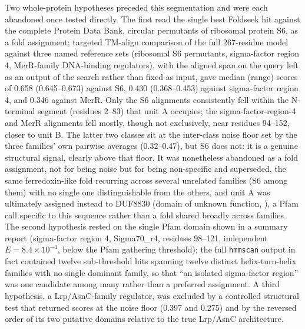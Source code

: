 \documentclass[11pt,a4paper]{article}
\begin{document}
Two whole-protein hypotheses preceded this segmentation and were each abandoned once tested
directly. The first read the single best Foldseek hit against the complete Protein Data Bank,
circular permutants of ribosomal protein S6, as a fold assignment; targeted TM-align comparison of
the full 267-residue model against three named reference sets (ribosomal S6 permutants,
sigma-factor region 4, MerR-family DNA-binding regulators), with the aligned span on the query left
as an output of the search rather than fixed as input, gave median (range) scores of 0.658
(0.645--0.673) against S6, 0.430 (0.368--0.453) against sigma-factor region 4, and 0.346 against
MerR. Only the S6 alignments consistently fell within the N-terminal segment (residues 2--83) that
unit A occupies; the sigma-factor-region-4 and MerR alignments fell mostly, though not exclusively,
near residues 94--152, closer to unit B. The latter two classes sit at the inter-class noise floor
set by the three families' own pairwise averages (0.32--0.47), but S6 does not: it is a genuine structural
signal, clearly above that floor. It was nonetheless abandoned as a fold assignment, not for being
noise but for being non-specific and superseded, the same ferredoxin-like fold recurring across
several unrelated families (S6 among them) with no single one distinguishable from the others, and
unit A was ultimately assigned instead to DUF8830 (domain of unknown function,
), a Pfam call specific to this sequence rather than a fold shared broadly
across families. The second
hypothesis rested on the single Pfam domain shown in a summary report (sigma-factor region 4,
Sigma70\_r4, residues 98--121, independent $E=8.4\times10^{-4}$, below the Pfam gathering
threshold); the full \texttt{hmmscan} output in fact contained twelve sub-threshold hits spanning
twelve distinct helix-turn-helix families with no single dominant family, so that ``an isolated
sigma-factor region'' was one candidate among many rather than a preferred assignment. A third
hypothesis, a Lrp/AsnC-family regulator, was excluded by a controlled structural test that returned
scores at the noise floor (0.397 and 0.275) and by the reversed order of its two putative domains
relative to the true Lrp/AsnC architecture.
\end{document}
